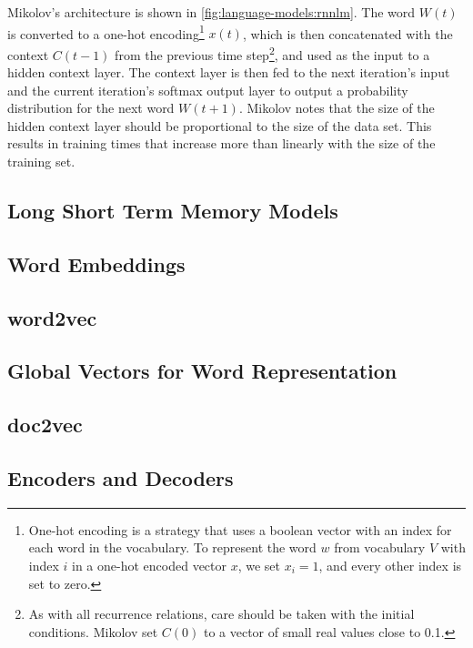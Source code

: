 Mikolov's architecture is shown in \autoref{fig:language-models:rnnlm}.
The word $W(t)$ is converted to a one-hot encoding\footnote{
    One-hot encoding is a strategy that uses a boolean vector with an index for each word in the vocabulary.
    To represent the word $w$ from vocabulary $V$ with index $i$ in a one-hot encoded vector $x$, we set $x_i = 1$, and every other index is set to zero.}
$x(t)$, which is then concatenated with the context $C(t-1)$ from the previous time step\footnote{
    As with all recurrence relations, care should be taken with the initial conditions.
    Mikolov set $C(0)$ to a vector of small real values close to 0.1.},
and used as the input to a hidden context layer.
The context layer is then fed to the next iteration's input and the current iteration's softmax output layer to output a probability distribution for the next word $W(t+1)$.
Mikolov notes that the size of the hidden context layer should be proportional to the size of the data set.
This results in training times that increase more than linearly with the size of the training set.

\subsection{Long Short Term Memory Models}\label{sec:language-models:lstms}


\subsection{Word Embeddings}\label{sec:language-models:word-embeddings}
\subsection{word2vec}\label{sec:language-models:word2vec}
\subsection{Global Vectors for Word Representation}\label{sec:language-models:glove}
\subsection{doc2vec}\label{sec:language-models:doc2vec}

\subsection{Encoders and Decoders}\label{sec:language-models:encoders-decoders}
